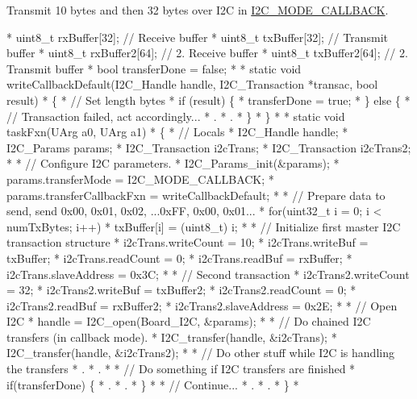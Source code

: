 Transmit 10 bytes and then 32 bytes over I2\-C in \hyperlink{_i2_c_8h_a39f3b9340fc4ee241b0d2da9b2841c26a129731a7edeb285f43a54b2cf9f5ac72}{I2\-C\-\_\-\-M\-O\-D\-E\-\_\-\-C\-A\-L\-L\-B\-A\-C\-K}. 
\begin{DoxyCode}
*  uint8\_t rxBuffer[32];            \textcolor{comment}{// Receive buffer}
*  uint8\_t txBuffer[32];            \textcolor{comment}{// Transmit buffer}
*  uint8\_t rxBuffer2[64];           \textcolor{comment}{// 2. Receive buffer}
*  uint8\_t txBuffer2[64];           \textcolor{comment}{// 2. Transmit buffer}
*  \textcolor{keywordtype}{bool} transferDone = \textcolor{keyword}{false};
*
*  \textcolor{keyword}{static} \textcolor{keywordtype}{void} writeCallbackDefault(I2C_Handle handle, I2C_Transaction *transac, \textcolor{keywordtype}{bool} result)
*  \{
*      \textcolor{comment}{// Set length bytes}
*      \textcolor{keywordflow}{if} (result) \{
*          transferDone = \textcolor{keyword}{true};
*      \} \textcolor{keywordflow}{else} \{
*          \textcolor{comment}{// Transaction failed, act accordingly...}
*          .
*          .
*      \}
*  \}
*
*  \textcolor{keyword}{static} \textcolor{keywordtype}{void} taskFxn(UArg a0, UArg a1)
*  \{
*      \textcolor{comment}{// Locals}
*      I2C_Handle handle;
*      I2C_Params params;
*      I2C_Transaction i2cTrans;
*      I2C_Transaction i2cTrans2;
*
*      \textcolor{comment}{// Configure I2C parameters.}
*      I2C_Params_init(&params);
*      params.transferMode = I2C_MODE_CALLBACK;
*      params.transferCallbackFxn = writeCallbackDefault;
*
*      \textcolor{comment}{// Prepare data to send, send 0x00, 0x01, 0x02, ...0xFF, 0x00, 0x01...}
*      \textcolor{keywordflow}{for}(uint32\_t i = 0; i < numTxBytes; i++)
*          txBuffer[i] = (uint8\_t) i;
*
*      \textcolor{comment}{// Initialize first master I2C transaction structure}
*      i2cTrans.writeCount   = 10;
*      i2cTrans.writeBuf     = txBuffer;
*      i2cTrans.readCount    = 0;
*      i2cTrans.readBuf      = rxBuffer;
*      i2cTrans.slaveAddress = 0x3C;
*
*      \textcolor{comment}{// Second transaction}
*      i2cTrans2.writeCount   = 32;
*      i2cTrans2.writeBuf     = txBuffer2;
*      i2cTrans2.readCount    = 0;
*      i2cTrans2.readBuf      = rxBuffer2;
*      i2cTrans2.slaveAddress = 0x2E;
*
*      \textcolor{comment}{// Open I2C}
*      handle = I2C_open(Board\_I2C, &params);
*
*      \textcolor{comment}{// Do chained I2C transfers (in callback mode).}
*      I2C_transfer(handle, &i2cTrans);
*      I2C_transfer(handle, &i2cTrans2);
*
*      \textcolor{comment}{// Do other stuff while I2C is handling the transfers}
*      .
*      .
*
*      \textcolor{comment}{// Do something if I2C transfers are finished}
*      \textcolor{keywordflow}{if}(transferDone) \{
*          .
*          .
*      \}
*
*      \textcolor{comment}{// Continue...}
*      .
*      .
*  \}
*  
\end{DoxyCode}


